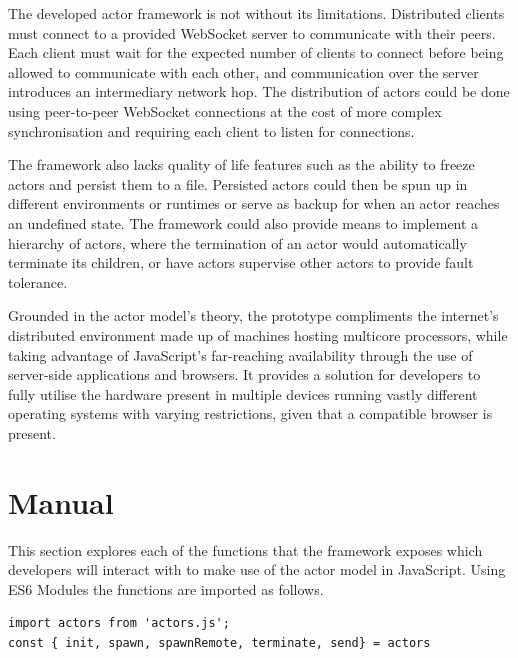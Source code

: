 \documentclass[oneside]{um-fict}
\begin{document}
The developed actor framework is not without its limitations. Distributed clients must connect to a provided WebSocket server to communicate with their peers. Each client must wait for the expected number of clients to connect before being allowed to communicate with each other, and communication over the server introduces an intermediary network hop. The distribution of actors could be done using peer-to-peer WebSocket connections at the cost of more complex synchronisation and requiring each client to listen for connections.

The framework also lacks quality of life features such as the ability to freeze actors and persist them to a file. Persisted actors could then be spun up in different environments or runtimes or serve as backup for when an actor reaches an undefined state. The framework could also provide means to implement a hierarchy of actors, where the termination of an actor would automatically terminate its children, or have actors supervise other actors to provide fault tolerance.

Grounded in the actor model's theory, the prototype compliments the internet's distributed environment made up of machines hosting multicore processors, while taking advantage of JavaScript's far-reaching availability through the use of server-side applications and browsers. It provides a solution for developers to fully utilise the hardware present in multiple devices running vastly different operating systems with varying restrictions, given that a compatible browser is present.

{%
    \if@openright\cleardoublepage\else\clearpage\fi
    {\scriptsize}
	\printindex
}

\appendix
\chapter{Manual}
This section explores each of the functions that the framework exposes which developers will interact with to make use of the actor model in JavaScript. Using ES6 Modules the functions are imported as follows.
\begin{lstlisting}
import actors from 'actors.js';
const { init, spawn, spawnRemote, terminate, send} = actors
\end{lstlisting}
\end{document}

